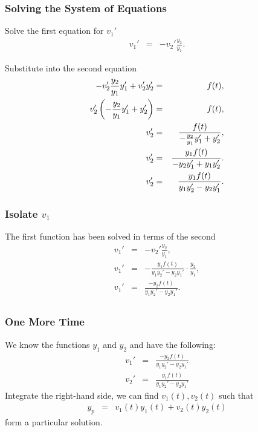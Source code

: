 \begin{frame}
  \frametitle{Solving the System of Equations}

  Solve the first equation for $v_1'$
  \begin{eqnarray*}
    v_1' & = & -v_2' \frac{y_2}{y_1}.
  \end{eqnarray*}

  Substitute into the second equation
  \begin{eqnarray*}
    -v_2' \frac{y_2}{y_1} y_1' + v_2' y_2'  & = & f(t), \\
    v_2' \left( -\frac{y_2}{y_1} y_1' + y_2' \right)  & = & f(t), \\
    v_2' & = & \frac{f(t)}{-\frac{y_2}{y_1} y_1' + y_2'}, \\
    v_2' & = & \frac{y_1 f(t)}{-y_2 y_1' + y_1 y_2'}. \\
    v_2' & = & \frac{y_1 f(t)}{y_1 y_2'-y_2 y_1'}. \\
  \end{eqnarray*}

\end{frame}


\begin{frame}
  \frametitle{Isolate $v_1$}

  The first function has been solved in terms of the second
  \begin{eqnarray*}
    v_1' & = & -v_2' \frac{y_2}{y_1}, \\
    v_1' & = & - \frac{y_1 f(t)}{y_1 y_2'-y_2 y_1'} \cdot \frac{y_2}{y_1}, \\
    v_1' & = & \frac{ -y_2 f(t)}{y_1 y_2'-y_2 y_1'}. \\
  \end{eqnarray*}
  


\end{frame}


\begin{frame}
  \frametitle{One More Time}

  We know the functions $y_1$ and $y_2$ and have the following:
  \begin{eqnarray*}
    v_1' & = & \frac{ -y_2 f(t)}{y_1 y_2'-y_2 y_1'} \\
    v_2' & = & \frac{y_1 f(t)}{y_1 y_2'-y_2 y_1'}
  \end{eqnarray*}
  Integrate the right-hand side, we can find $v_1(t), v_2(t)$ such that
  \begin{eqnarray*}
      y_p & = & v_1(t) y_1(t) + v_2(t) y_2(t)
    \end{eqnarray*}
  form a particular solution.   
\end{frame}

